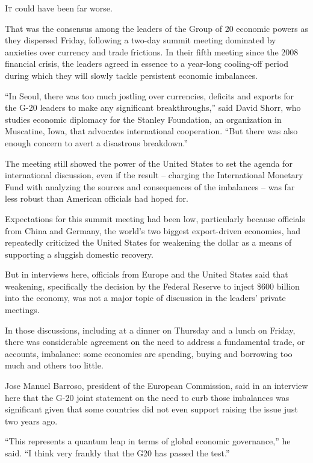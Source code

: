 ﻿\documentclass[12pt]{article}
\begin{document}
\lettrine{I}{t} could have been far worse.

That was the consensus among the leaders of the Group of 20 economic powers as they dispersed
Friday, following a two-day summit meeting dominated by anxieties over currency and trade frictions.
In their fifth meeting since the 2008 financial crisis, the leaders agreed in essence to a year-long
cooling-off period during which they will slowly tackle persistent economic imbalances.

``In Seoul, there was too much jostling over currencies, deficits and exports for the G-20 leaders
to make any significant breakthroughs,'' said David Shorr, who studies economic diplomacy for the
Stanley Foundation, an organization in Muscatine, Iowa, that advocates international cooperation.
``But there was also enough concern to avert a disastrous breakdown.''

The meeting still showed the power of the United States to set the agenda for international
discussion, even if the result -- charging the International Monetary Fund with analyzing the
sources and consequences of the imbalances -- was far less robust than American officials had hoped
for.

Expectations for this summit meeting had been low, particularly because officials from China and
Germany, the world's two biggest export-driven economies, had repeatedly criticized the United
States for weakening the dollar as a means of supporting a sluggish domestic recovery.

But in interviews here, officials from Europe and the United States said that weakening,
specifically the decision by the Federal Reserve to inject \$600 billion into the economy, was not a
major topic of discussion in the leaders' private meetings.

In those discussions, including at a dinner on Thursday and a lunch on Friday, there was
considerable agreement on the need to address a fundamental trade, or accounts, imbalance: some
economies are spending, buying and borrowing too much and others too little.

Jose Manuel Barroso, president of the European Commission, said in an interview here that the G-20
joint statement on the need to curb those imbalances was significant given that some countries did
not even support raising the issue just two years ago.

``This represents a quantum leap in terms of global economic governance,'' he said. ``I think very
frankly that the G20 has passed the test.''
\end{document}
